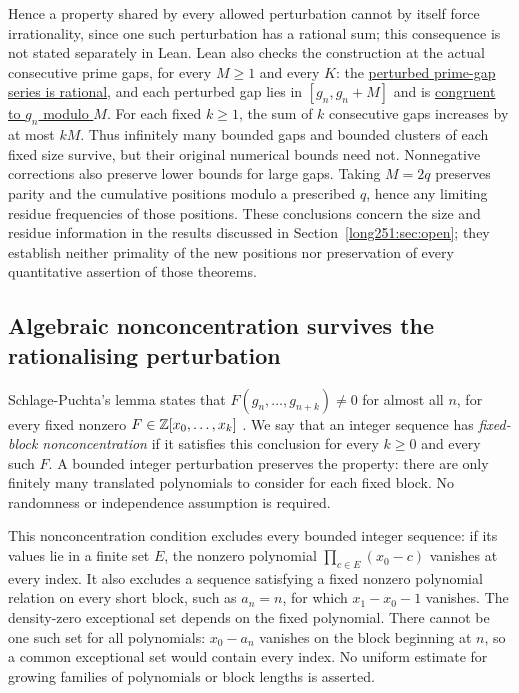\documentclass[11pt]{article}
\begin{document}
\noindent Hence a property shared by every allowed perturbation cannot by
itself force irrationality, since one such perturbation has a rational sum;
this consequence is not stated separately in Lean.  Lean also checks the construction at the actual consecutive prime gaps,
for every $M\ge1$ and every $K$: the
\href{https://github.com/wcook04/plectis-erdos/blob/3d6d938d696fed0fb71dd55115a18a73738ff223/lean/ErdosProblems/Erdos251/BoundedPerturbationCountermodel.lean\#L208}{perturbed
prime-gap series is rational}, and each perturbed gap lies in
$[g_n,g_n+M]$ and is
\href{https://github.com/wcook04/plectis-erdos/blob/3d6d938d696fed0fb71dd55115a18a73738ff223/lean/ErdosProblems/Erdos251/BoundedPerturbationCountermodel.lean\#L234}{congruent
to $g_n$ modulo $M$}.  For each fixed $k\ge1$, the sum of $k$ consecutive gaps
increases by at most $kM$.  Thus infinitely many bounded gaps and bounded
clusters of each fixed size survive, but their original numerical bounds
need not.  Nonnegative corrections also preserve lower bounds for large
gaps.  Taking $M=2q$ preserves parity
and the cumulative positions modulo a prescribed $q$, hence any limiting
residue frequencies of those positions.  These conclusions concern the
size and residue information in the results discussed in
Section~\ref{long251:sec:open}; they establish neither primality of the
new positions nor preservation of every quantitative assertion of those
theorems.

\subsection{Algebraic nonconcentration survives the rationalising perturbation}

Schlage-Puchta's lemma states that
$F(g_n,\ldots,g_{n+k})\ne0$ for almost all $n$, for every fixed nonzero
$F\in\mathbb{Z}[x_0,\ldots,x_k]$ \cite[Lemma~4, pp.~5--6]{schlagepuchta2011}.
We say that an integer sequence has \emph{fixed-block nonconcentration}
if it satisfies this conclusion for every $k\ge0$ and every such $F$.
A bounded integer perturbation preserves the property: there are only
finitely many translated polynomials to consider for each fixed block.
No randomness or independence assumption is required.


This nonconcentration condition excludes every bounded integer sequence:
if its values lie in a finite set $E$, the nonzero polynomial
$\prod_{c\in E}(x_0-c)$ vanishes at every index.  It also excludes a
sequence satisfying a fixed nonzero polynomial relation on every short
block, such as $a_n=n$, for which $x_1-x_0-1$ vanishes.  The density-zero exceptional set depends on the fixed polynomial.
There cannot be one such set for all polynomials: $x_0-a_n$ vanishes on
the block beginning at $n$, so a common exceptional set would contain
every index.  No uniform estimate for growing families of polynomials or
block lengths is asserted.
\end{document}
